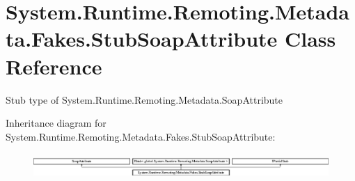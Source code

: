 \hypertarget{class_system_1_1_runtime_1_1_remoting_1_1_metadata_1_1_fakes_1_1_stub_soap_attribute}{\section{System.\-Runtime.\-Remoting.\-Metadata.\-Fakes.\-Stub\-Soap\-Attribute Class Reference}
\label{class_system_1_1_runtime_1_1_remoting_1_1_metadata_1_1_fakes_1_1_stub_soap_attribute}
}


Stub type of System.\-Runtime.\-Remoting.\-Metadata.\-Soap\-Attribute 


Inheritance diagram for System.\-Runtime.\-Remoting.\-Metadata.\-Fakes.\-Stub\-Soap\-Attribute\-:\begin{figure}[H]
\begin{center}
\leavevmode
\includegraphics[height=0.959726cm]{class_system_1_1_runtime_1_1_remoting_1_1_metadata_1_1_fakes_1_1_stub_soap_attribute}
\end{center}
\end{figure}
